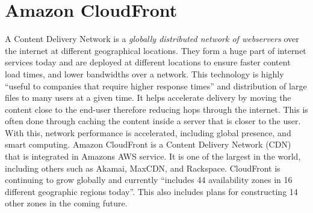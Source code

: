 \section{Amazon CloudFront}
A Content Delivery Network is a \emph{globally distributed network of webservers} \cite{hid-sp18-512-amazon-cloudfront-b} over the internet at different geographical locations. They form a huge part of internet services today and are deployed at different locations to ensure faster content load times, and lower bandwidths over a network. This technology is highly “useful to companies that require higher response times”\cite{hid-sp18-512-amazon-cloudfront-b} and distribution of large files to many users at a given time. It helps accelerate delivery by moving the content close to the end-user therefore reducing hops through the internet. This is often done through caching the content inside a server that is closer to the user. With this, network performance is accelerated, including global presence, and smart computing. Amazon CloudFront is a Content Delivery Network (CDN) that is integrated in Amazons AWS service. It is one of the largest in the world, including others such as Akamai, MaxCDN, and Rackspace. CloudFront is continuing to grow globally and currently ``includes 44 availability zones in 16 different geographic regions today''\cite{hid-sp18-512-amazon-cloudfront-a}. This also includes plans for constructing 14 other zones in the coming future.
